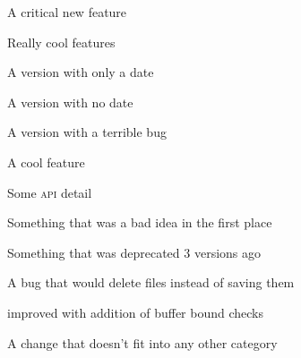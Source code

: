 \documentclass{article}
\begin{document}
\begin{changelog}[author=Rebecca Turner,
	sectioncmd=\subsection,
	title=Example changelog]
\begin{version}
\critical
	\item A critical new feature
\added
	\item Really cool features
\end{version}

\begin{version}[date=2019-01-23, short]
	A version with only a date
\end{version}

\begin{version}[v=1.1.0, simple]
	\item A version with no date
\end{version}

\begin{version}[v=1.0.1, yanked, simple]
	\item A version with a terrible bug
\end{version}

\begin{version}[v=1.0.0, date=2018-10-26]
\added
	\item A cool feature
\changed
	\item Some \textsc{api} detail
\deprecated
	\item Something that was a bad idea in the first place
\removed
	\item Something that was deprecated 3 versions ago
\fixed
	\item A bug that would delete files instead of saving them
\security
	\item improved with addition of buffer bound checks
\misc
	\item A change that doesn't fit into any other category
\end{version}

\end{changelog}
\end{document}
